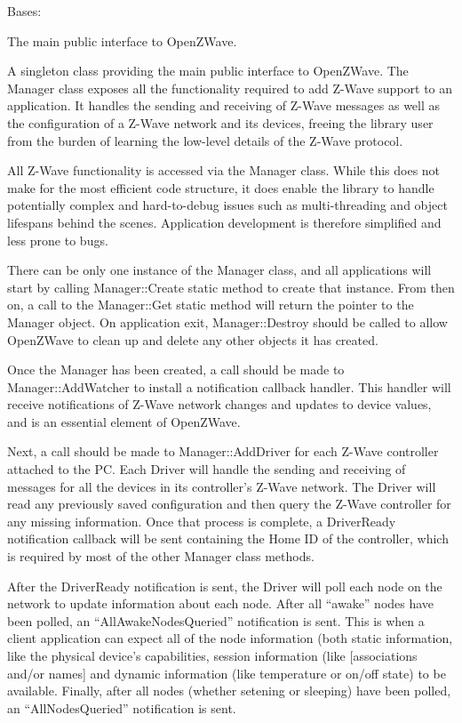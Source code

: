 \documentclass[letterpaper,10pt,english]{sphinxmanual}
\begin{document}

\begin{fulllineitems}
\label{libopenzwave:libopenzwave.PyManager}
Bases: 

The main public interface to OpenZWave.

A singleton class providing the main public interface to OpenZWave.  The
Manager class exposes all the functionality required to add Z-Wave support to
an application.  It handles the sending and receiving of Z-Wave messages as
well as the configuration of a Z-Wave network and its devices, freeing the
library user from the burden of learning the low-level details of the Z-Wave
protocol.

All Z-Wave functionality is accessed via the Manager class.  While this does
not make for the most efficient code structure, it does enable the library to
handle potentially complex and hard-to-debug issues such as multi-threading and
object lifespans behind the scenes. Application development is therefore
simplified and less prone to bugs.

There can be only one instance of the Manager class, and all applications will
start by calling Manager::Create static method to create that instance.  From
then on, a call to the Manager::Get static method will return the pointer to
the Manager object.  On application exit, Manager::Destroy should be called to
allow OpenZWave to clean up and delete any other objects it has created.

Once the Manager has been created, a call should be made to Manager::AddWatcher
to install a notification callback handler.  This handler will receive
notifications of Z-Wave network changes and updates to device values, and is an
essential element of OpenZWave.

Next, a call should be made to Manager::AddDriver for each Z-Wave controller
attached to the PC.  Each Driver will handle the sending and receiving of
messages for all the devices in its controller's Z-Wave network.  The Driver
will read any previously saved configuration and then query the Z-Wave
controller for any missing information.  Once that process is complete, a
DriverReady notification callback will be sent containing the Home ID of the
controller, which is required by most of the other Manager class methods.

After the DriverReady notification is sent, the Driver will poll each node on
the network to update information about each node.  After all ``awake'' nodes
have been polled, an ``AllAwakeNodesQueried'' notification is sent.  This is when
a client application can expect all of the node information (both static
information, like the physical device's capabilities, session information (like
{[}associations and/or names{]} and dynamic information (like temperature or on/off
state) to be available.  Finally, after all nodes (whether setening or
sleeping) have been polled, an ``AllNodesQueried'' notification is sent.


\end{fulllineitems}
\end{document}
